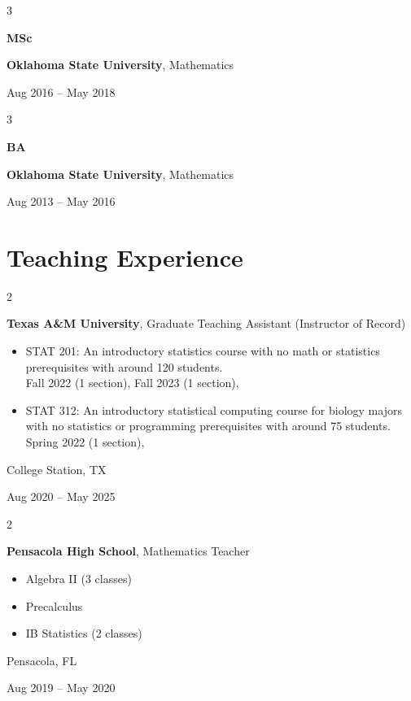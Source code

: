 \documentclass[10pt, letterpaper]{article}
\newenvironment{highlights}{
	\begin{itemize}[
		topsep=0.10 cm,
		parsep=0.10 cm,
		partopsep=0pt,
		itemsep=0pt,
		leftmargin=0.4 cm + 10pt
		]
	}{
	\end{itemize}
} %
\newenvironment{twocolentry}[2][]{
	\onecolentry
	\def\secondColumn{#2}
	\setcolumnwidth{\fill, 4.5 cm}
	\begin{paracol}{2}
	}{
		\switchcolumn \raggedleft \secondColumn
	\end{paracol}
	\endonecolentry
} %
\newenvironment{threecolentry}[3][]{
	\onecolentry
	\def\thirdColumn{#3}
	\setcolumnwidth{1 cm, \fill, 4.5 cm}
	\begin{paracol}{3}
		{\raggedright #2} \switchcolumn
	}{
		\switchcolumn \raggedleft \thirdColumn
	\end{paracol}
	\endonecolentry
} %
\begin{document}
	\begin{threecolentry}{\textbf{MSc}}{
			Aug 2016 – May 2018
		}
		\textbf{Oklahoma State University}, Mathematics
	\end{threecolentry}

	\begin{threecolentry}{\textbf{BA}}{
			Aug 2013 – May 2016
		}
		\textbf{Oklahoma State University}, Mathematics
	\end{threecolentry}
	
	
	
	
	
	
	
	
	
	
	
	










	
	\section{Teaching Experience}
	
	
	\begin{twocolentry}{
			College Station, TX
			
			Aug 2020 – May 2025
		}
		\textbf{Texas A\&M University}, Graduate Teaching Assistant (Instructor of Record)
		\begin{highlights}
			\item STAT 201: An introductory statistics course with no math or statistics prerequisites with around 120 students. \\ 
			Fall 2022 (1 section), Fall 2023 (1 section),
			\item STAT 312: An introductory statistical computing course for biology majors with no statistics or programming prerequisites with around 75 students. \\  
			Spring 2022 (1 section), 
		\end{highlights}
	\end{twocolentry}

	\vspace{0.2 cm}

	\begin{twocolentry}{
			Pensacola, FL
			
			Aug 2019 – May 2020
		}
		\textbf{Pensacola High School}, Mathematics Teacher 
		\begin{highlights}
			\item Algebra II (3 classes)
			\item Precalculus
			\item IB Statistics (2 classes)
		\end{highlights}
	\end{twocolentry}
\end{document}

